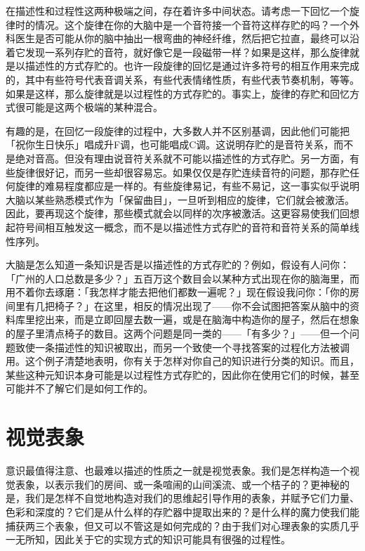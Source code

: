 \documentclass[
  12pt,
  twoside,
  openright,
  oldfontcommands,
]{memoir}
\begin{document}
在描述性和过程性这两种极端之间，存在着许多中间状态。请考虑一下回忆一个旋律时的情况。这个旋律在你的大脑中是一个音符接一个音符这样存贮的吗？一个外科医生是否可能从你的脑中抽出一根弯曲的神经纤维，然后把它拉直，最终可以沿着它发现一系列存贮的音符，就好像它是一段磁带一样？如果是这样，那么旋律就是以描述性的方式存贮的。也许一段旋律的回忆是通过许多符号的相互作用来完成的，其中有些符号代表音调关系，有些代表情绪性质，有些代表节奏机制，等等。如果是这样，那么旋律就是以过程性的方式存贮的。事实上，旋律的存贮和回忆方式很可能是这两个极端的某种混合。

有趣的是，在回忆一段旋律的过程中，大多数人并不区别基调，因此他们可能把「祝你生日快乐」唱成升F调，也可能唱成C调。这说明存贮的是音符关系，而不是绝对音高。但没有理由说音符关系就不可能以描述性的方式存贮。另一方面，有些旋律很好记，而另一些却很容易忘。如果仅仅是存贮连续音符的问题，那存贮任何旋律的难易程度都应是一样的。有些旋律易记，有些不易记，这一事实似乎说明大脑以某些熟悉模式作为「保留曲目」，一旦听到相应的旋律，它们就会被激活。因此，要再现这个旋律，那些模式就会以同样的次序被激活。这更容易使我们回想起符号间相互触发这一概念，而不是以描述性方式存贮的音符和音符关系的简单线性序列。

大脑是怎么知道一条知识是否是以描述性的方式存贮的？例如，假设有人问你：「广州的人口总数是多少？」五百万这个数目会以某种方式出现在你的脑海里，而用不着你去琢磨：「我怎样才能去把他们都数一遍呢？」现在假设我问你：「你的房间里有几把椅子？」在这里，相反的情况出现了------你不会试图把答案从脑中的资料库里挖出来，而是立即回屋去数一遍，或是在脑海中构造你的屋子，然后在想象的屋子里清点椅子的数目。这两个问题是同一类的------「有多少？」------但一个问题致使一条描述性的知识被取出，而另一个致使一个寻找答案的过程化方法被调用。这个例子清楚地表明，你有关于怎样对你自己的知识进行分类的知识。而且，某些这种元知识本身可能是以过程性方式存贮的，因此你在使用它们的时候，甚至可能并不了解它们是如何工作的。

\section{视觉表象}

意识最值得注意、也最难以描述的性质之一就是视觉表象。我们是怎样构造一个视觉表象，以表示我们的房间、或一条喧闹的山间溪流、或一个桔子的？更神秘的是，我们是怎样不自觉地构造对我们的思维起引导作用的表象，并赋予它们力量、色彩和深度的？它们是从什么样的存贮器中提取出来的？是什么样的魔力使我们能捕获两三个表象，但又可以不管这是如何完成的？由于我们对心理表象的实质几乎一无所知，因此关于它的实现方式的知识可能具有很强的过程性。
\end{document}

